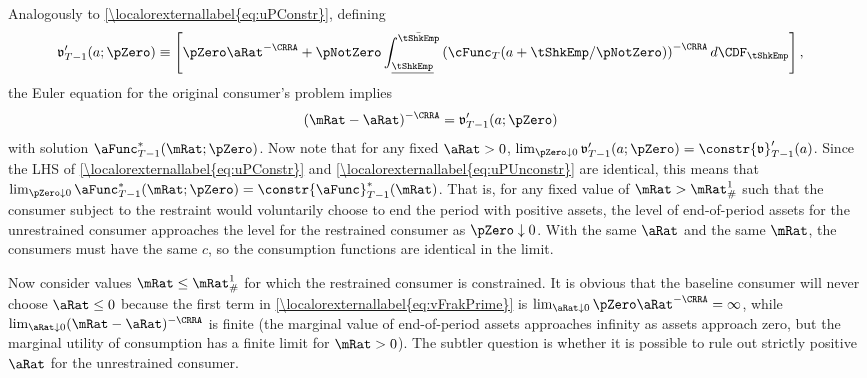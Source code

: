 \documentclass[\econtexRoot/BufferStockTheory]{subfiles}
\begin{document}
Analogously to \eqref{\localorexternallabel{eq:uPConstr}}, defining
\begin{equation}\begin{gathered}\begin{aligned}
  \mathfrak{v}_{T-1}^{\prime}(a;\pZero)  & \equiv  \left[\pZero \aRat^{-\CRRA}+\pNotZero\int_{\underline{\tShkEmp}}^{\bar{\tShkEmp}} \left(\cFunc_{T}(a+\tShkEmp/\pNotZero)\right)^{-\CRRA} d\CDF_{\tShkEmp}\right], \label{eq:vFrakPrime}
\end{aligned}\end{gathered}\end{equation}
the Euler equation for the original consumer's problem implies
\begin{equation}\begin{gathered}\begin{aligned}
 (\mRat-\aRat)^{-\CRRA}  & = \mathfrak{v}_{T-1}^{\prime}(a;\pZero) \label{eq:uPUnconstr}
\end{aligned}\end{gathered}\end{equation}
with solution $\aFunc_{T-1}^{*}(\mRat;\pZero)$.  Now note that for any
fixed $\aRat>0$, $\lim_{\pZero \downarrow 0}
\mathfrak{v}_{T-1}^{\prime}(a;\pZero) =
\constr{\mathfrak{v}}_{T-1}^{\prime}(a)$.  Since the LHS of
\eqref{\localorexternallabel{eq:uPConstr}} and \eqref{\localorexternallabel{eq:uPUnconstr}} are identical, this
means that $\lim_{\pZero \downarrow 0}
\aFunc_{T-1}^{*}(\mRat;\pZero) =
\constr{\aFunc}_{T-1}^{*}(\mRat)$.  That is, for any fixed value of
$\mRat > \mRat^{1}_{\#}$ such that the consumer subject to the
restraint would voluntarily choose to end the period with positive
assets, the level of end-of-period assets for the unrestrained
consumer approaches the level for the restrained consumer as $\pZero
\downarrow 0$.  With the same $\aRat$ and the same $\mRat$, the
consumers must have the same $c$, so the consumption functions are
identical in the limit.

Now consider values $\mRat\leq \mRat^{1}_{\#}$ for which the restrained consumer
is constrained.  It is obvious that the baseline consumer will never
choose $\aRat \leq 0$ because the first term in \eqref{\localorexternallabel{eq:vFrakPrime}} is $\lim_{\aRat \downarrow 0} \pZero  \aRat^{-\CRRA} =
\infty$, while $\lim_{\aRat \downarrow 0} (\mRat-\aRat)^{-\CRRA}$ is finite (the
marginal value of end-of-period assets approaches infinity as assets approach
zero, but the marginal utility of consumption has a finite limit for $\mRat>0$).
The subtler question is whether it is possible to rule out strictly positive
$\aRat$ for the unrestrained consumer.
\end{document}

